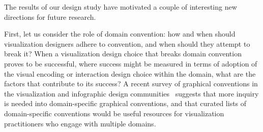 The results of our design study have motivated a couple of interesting new directions for future research.

First, let us consider the role of domain convention: how and when should visualization designers adhere to convention, and when should they attempt to break it? 
When a visualization design choice that breaks domain convention proves to be successful, where success might be measured in terms of adoption of the visual encoding or interaction design choice within the domain, what are the factors that contribute to its success?
A recent survey of graphical conventions in the visualization and infographic design communities~\cite{Byrne2016} suggests that more inquiry is needed into domain-specific graphical conventions, and that curated lists of domain-specific conventions would be useful resources for visualization practitioners who engage with multiple domains. 

